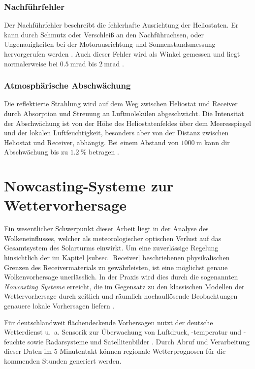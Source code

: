 \subsubsection*{Nachführfehler} \label{subsubsec_Nachführfehler}
Der Nachführfehler beschreibt die fehlerhafte Ausrichtung der Heliostaten.
Er kann durch Schmutz oder Verschleiß an den Nachführachsen, oder Ungenauigkeiten bei der Motorausrichtung und Sonnenstandsmessung hervorgerufen werden \cite[S.7]{Richter}. Auch dieser Fehler wird als Winkel gemessen und liegt normalerweise bei $\SI{0.5}{\milli\radian}$ bis $\SI{2}{\milli\radian}$ \cite[S.17]{DissBelhomme}.

\subsubsection*{Atmosphärische Abschwächung} \label{subsubsec_AtmosphärischeAbschwächung}
Die reflektierte Strahlung wird auf dem Weg zwischen Heliostat und Receiver durch Absorption und Streuung an Luftmolekülen abgeschwächt.
Die Intensität der Abschwächung ist von der Höhe des Heliostatenfeldes über dem Meeresspiegel und der lokalen Luftfeuchtigkeit, besonders aber von der Distanz zwischen Heliostat und Receiver, abhängig.
Bei einem Abstand von $\SI{1000}{\metre}$ kann dir Abschwächung bis zu $\SI{1.2}{\percent}$ betragen \cite[S.121]{Biggs}\cite[S.17]{DissBelhomme}.



\section{Nowcasting-Systeme zur Wettervorhersage} \label{sec_Nowcasting}
Ein wesentlicher Schwerpunkt dieser Arbeit liegt in der Analyse des Wolkeneinflusses, welcher als meteorologischer optischen Verlust auf das Gesamtsystem des Solarturms einwirkt.
Um eine zuverlässige Regelung hinsichtlich der im Kapitel \ref{subsec_Receiver} beschriebenen physikalischen Grenzen des Receivermaterials zu gewährleisten, ist eine möglichst genaue Wolkenvorhersage unerlässlich.
In der Praxis wird dies durch die sogenannten \textit{Nowcasting Systeme} erreicht, die im Gegensatz zu den klassischen Modellen der Wettervorhersage durch zeitlich und räumlich hochauflösende Beobachtungen genauere lokale Vorhersagen liefern \cite{DWD1}.

Für deutschlandweit flächendeckende Vorhersagen nutzt der deutsche Wetterdienst u.~a. Sensorik zur Überwachung von Luftdruck, -temperatur und -feuchte sowie Radarsysteme und Satellitenbilder \cite{DWD1}\cite{DWD0}.
Durch Abruf und Verarbeitung dieser Daten im 5-Minutentakt können regionale Wetterprognosen für die kommenden Stunden generiert werden.

